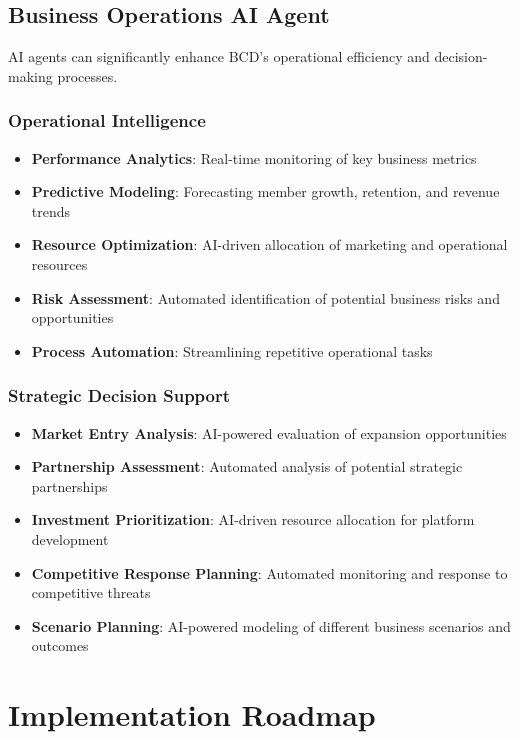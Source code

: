 \subsection{Business Operations AI Agent}
AI agents can significantly enhance BCD's operational efficiency and decision-making processes.

\subsubsection{Operational Intelligence}
\begin{itemize}
    \item \textbf{Performance Analytics}: Real-time monitoring of key business metrics
    \item \textbf{Predictive Modeling}: Forecasting member growth, retention, and revenue trends
    \item \textbf{Resource Optimization}: AI-driven allocation of marketing and operational resources
    \item \textbf{Risk Assessment}: Automated identification of potential business risks and opportunities
    \item \textbf{Process Automation}: Streamlining repetitive operational tasks
\end{itemize}

\subsubsection{Strategic Decision Support}
\begin{itemize}
    \item \textbf{Market Entry Analysis}: AI-powered evaluation of expansion opportunities
    \item \textbf{Partnership Assessment}: Automated analysis of potential strategic partnerships
    \item \textbf{Investment Prioritization}: AI-driven resource allocation for platform development
    \item \textbf{Competitive Response Planning}: Automated monitoring and response to competitive threats
    \item \textbf{Scenario Planning}: AI-powered modeling of different business scenarios and outcomes
\end{itemize}

\section{Implementation Roadmap}

